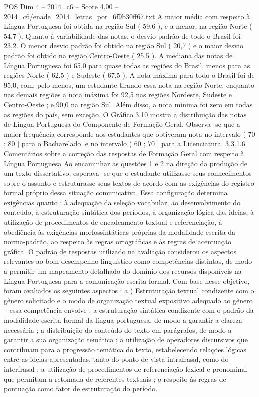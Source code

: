 \begin{textsample}{POS Dim 4 – 2014\_c6 – Score 4.00 – 2014\_c6/enade\_2014\_letras\_por\_6f9b30ff67.txt}
A maior média com respeito à Língua Portuguesa foi obtida na região Sul ( 59,6 ), e a menor, na região Norte ( 54,7 ).
Quanto à variabilidade das notas, o desvio padrão de todo o Brasil foi 23,2.
O menor desvio padrão foi obtido na região Sul ( 20,7 ) e o maior desvio padrão foi obtido na região Centro-Oeste ( 25,5 ).
A mediana das notas de Língua Portuguesa foi 65,0 para quase todas as regiões do Brasil, menos para as regiões Norte ( 62,5 ) e Sudeste ( 67,5 ).
A nota máxima para todo o Brasil foi de 95,0, com, pelo menos, um estudante tirando essa nota na região Norte, enquanto nas demais regiões a nota máxima foi 92,5 nas regiões Nordeste, Sudeste e Centro-Oeste ; e 90,0 na região Sul.
Além disso, a nota mínima foi zero em todas as regiões do país, sem exceção.
O Gráfico 3.10 mostra a distribuição das notas de Língua Portuguesa do Componente de Formação Geral.
Observa -se que a maior frequência corresponde aos estudantes que obtiveram nota no intervalo ( 70 ; 80 ] para o Bacharelado, e no intervalo ( 60 ; 70 ] para a Licenciatura. 3.3.1.6 Comentários sobre a correção das respostas de Formação Geral com respeito à Língua Portuguesa Ao encaminhar as questões 1 e 2 na direção da produção de um texto dissertativo, esperava -se que o estudante utilizasse seus conhecimentos sobre o assunto e estruturasse seus textos de acordo com as exigências do registro formal próprio dessa situação comunicativa.
Essa configuração determina exigências quanto : à adequação da seleção vocabular, ao desenvolvimento do conteúdo, à estruturação sintática dos períodos, à organização lógica das ideias, à utilização de procedimentos de encadeamento textual e referenciação, à obediência às exigências morfossintáticas próprias da modalidade escrita da norma-padrão, ao respeito às regras ortográficas e às regras de acentuação gráfica.
O padrão de respostas utilizado na avaliação considerou os aspectos relevantes ao bom desempenho linguístico como competências distintas, de modo a permitir um mapeamento detalhado do domínio dos recursos disponíveis na Língua Portuguesa para a comunicação escrita formal.
Com base nesse objetivo, foram avaliados os seguintes aspectos : a ) Estruturação textual condizente com o gênero solicitado e o modo de organização textual expositivo adequado ao gênero – essa competência envolve : a estruturação sintática condizente com o padrão da modalidade escrita formal da língua portuguesa, de modo a garantir a clareza necessária ; a distribuição do conteúdo do texto em parágrafos, de modo a garantir a sua organização temática ; a utilização de operadores discursivos que contribuam para a progressão temática do texto, estabelecendo relações lógicas entre as ideias apresentadas, tanto do ponto de vista intrafrasal, como do interfrasal ; a utilização de procedimentos de referenciação lexical e pronominal que permitam a retomada de referentes textuais ; o respeito às regras de pontuação como fator de estruturação do período.

\end{textsample}
